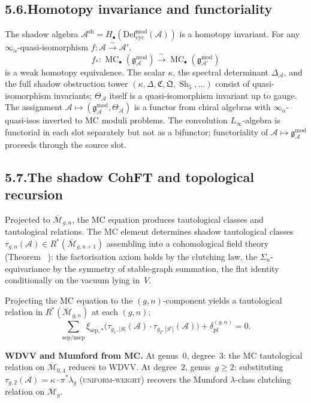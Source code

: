 \documentclass[11pt,reqno]{amsart}
\makeatletter
\theoremstyle{definition}
\theoremstyle{remark}
\providecommand{\cA}{\mathcal{A}}
\providecommand{\cM}{\mathcal{M}}
\providecommand{\Defcyc}{\mathrm{Def}_{\mathrm{cyc}}}
\providecommand{\gAmod}{\mathfrak{g}^{\mathrm{mod}}_\cA}
\providecommand{\Defcyc}{\mathrm{Def}_{\mathrm{cyc}}}
\numberwithin{equation}{section}
\let\svy@oldref\ref
\renewcommand{\ref}[1]{%
 \@ifundefined{r@#1}{\textit{full monograph}}{\svy@oldref{#1}}%
}
\makeatother
\begin{document}
\subsection*{5.6.\enspace Homotopy invariance and functoriality}

The shadow algebra $\cA^{\mathrm{sh}}=H_\bullet(\Defcyc^{\mathrm{mod}}(\cA))$
is a homotopy invariant. For any $\infty_\alpha$-quasi-isomorphism
$f\colon\cA\xrightarrow{\sim}\cA'$,
\[
f_*\colon\operatorname{MC}_\bullet(\gAmod)\xrightarrow{\;\sim\;}\operatorname{MC}_\bullet(\mathfrak g^{\mathrm{mod}}_{\cA'})
\]
is a weak homotopy equivalence. The scalar $\kappa$, the spectral
determinant $\Delta_\cA$, and the full shadow obstruction tower
$(\kappa,\Delta,\mathfrak C,\mathfrak Q,\operatorname{Sh}_5,\ldots)$
consist of quasi-isomorphism invariants; $\Theta_\cA$ itself is a
quasi-isomorphism invariant up to gauge. The assignment
$\cA\mapsto(\gAmod,\Theta_\cA)$ is a functor from chiral algebras with
$\infty_\alpha$-quasi-isos inverted to MC moduli problems. The
convolution $L_\infty$-algebra is functorial in each slot separately
but not as a bifunctor; functoriality of $\cA\mapsto\gAmod$ proceeds
through the source slot.

\subsection*{5.7.\enspace The shadow CohFT and topological recursion}

Projected to $\overline{\cM}_{g,n}$, the MC equation produces
tautological classes and tautological relations. The MC element
determines shadow tautological classes
$\tau_{g,n}(\cA)\in R^*(\overline{\cM}_{g,n+1})$ assembling into a
cohomological field theory (Theorem~\ref{thm:shadow-cohft}): the
factorisation axiom holds by the clutching law, the
$\Sigma_n$-equivariance by the symmetry of stable-graph summation,
the flat identity conditionally on the vacuum lying in~$V$.

Projecting the MC equation to the $(g,n)$-component yields a
tautological relation in $R^*(\overline{\cM}_{g,n})$ at each $(g,n)$:
\[
\sum_{\mathrm{sep}/\mathrm{nsep}}\xi_{\mathrm{sep},*}\bigl(\tau_{g_1,|S|}(\cA)\cdot\tau_{g_2,|S^c|}(\cA)\bigr)+\delta_{\mathrm{pf}}^{(g,n)}=0.
\]

\medskip
\noindent\textbf{WDVV and Mumford from MC.}\enspace
At genus~$0$, degree~$3$: the MC tautological relation on
$\overline{\cM}_{0,4}$ reduces to WDVV. At degree~$2$, genus~$g\ge 2$:
substituting $\tau_{g,2}(\cA)=\kappa\cdot\pi^*\lambda_g$
\textsc{(uniform-weight)} recovers the Mumford $\lambda$-class
clutching relation on $\overline{\cM}_g$.
\end{document}
